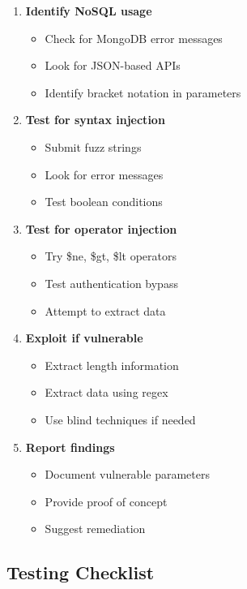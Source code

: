 \documentclass[12pt]{article}
\begin{document}
\begin{enumerate}
    \item \textbf{Identify NoSQL usage}
    \begin{itemize}
        \item Check for MongoDB error messages
        \item Look for JSON-based APIs
        \item Identify bracket notation in parameters
    \end{itemize}
    
    \item \textbf{Test for syntax injection}
    \begin{itemize}
        \item Submit fuzz strings
        \item Look for error messages
        \item Test boolean conditions
    \end{itemize}
    
    \item \textbf{Test for operator injection}
    \begin{itemize}
        \item Try \$ne, \$gt, \$lt operators
        \item Test authentication bypass
        \item Attempt to extract data
    \end{itemize}
    
    \item \textbf{Exploit if vulnerable}
    \begin{itemize}
        \item Extract length information
        \item Extract data using regex
        \item Use blind techniques if needed
    \end{itemize}
    
    \item \textbf{Report findings}
    \begin{itemize}
        \item Document vulnerable parameters
        \item Provide proof of concept
        \item Suggest remediation
    \end{itemize}
\end{enumerate}

\subsection{Testing Checklist}
\end{document}

